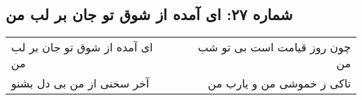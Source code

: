 \begin{center}
\section*{شماره ۲۷: ای آمده از شوق تو جان بر لب من}
\label{sec:027}
\begin{longtable}{l p{0.5cm} r}
ای آمده از شوق تو جان بر لب من
&&
چون روز قیامت است بی تو شب من
\\
آخر سخنی از من بی دل بشنو
&&
تاکی ز خموشی من و یارب من
\\
\end{longtable}
\end{center}
